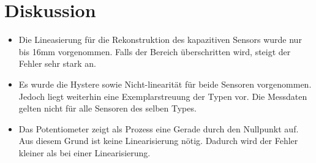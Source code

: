 \section{Diskussion}
\begin{itemize}
    \item Die Lineasierung für die Rekonstruktion des kapazitiven Sensors wurde nur bis 16mm vorgenommen. Falls der Bereich überschritten wird, steigt der Fehler sehr stark an.
    \item Es wurde die Hystere sowie Nicht-linearität für beide Sensoren vorgenommen. Jedoch liegt weiterhin eine Exemplarstreuung der Typen vor. Die Messdaten gelten nicht für alle Sensoren des selben Types.
    \item Das Potentiometer zeigt als Prozess eine Gerade durch den Nullpunkt auf. Aus diesem Grund ist keine Linearisierung nötig. Dadurch wird der Fehler kleiner als bei einer Linearisierung. 
\end{itemize}
      
\clearpage